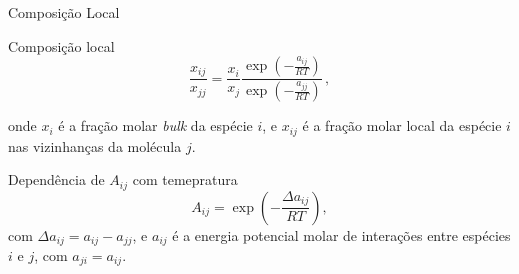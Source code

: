 \documentclass{beamer}
\begin{document}
\begin{frame}{Composição Local}
	\begin{block}{Composição local}
		\begin{equation}
		\frac{x_{ij}}{x_{jj}}=\frac{x_i}{x_j} \frac{\exp(-\frac{a_{ij}}{RT})}{\exp(-\frac{a_{jj}}{RT})}\,,
		\end{equation}
	\end{block}
onde  $x_i$ 
é a fração molar {\it bulk} da espécie $i$, e 
$x_{ij}$ é a fração molar local da espécie $i$
nas vizinhanças da molécula $j$.
\end{frame}


\begin{frame}{Dependência de $A_{ij}$ com temepratura}
%
\begin{equation}
\label{eq:A1}
 A_{ij}=\exp\left( - \frac{\Delta a_{ij}}{RT}\right),
\end{equation}
com $\Delta a_{ij}=a_{ij}-a_{jj}$, e
$a_{ij}$ 
é a energia potencial molar de interações entre espécies 
$i$ e $j$, com $a_{ji}=a_{ij}$. 
%
%
	\begin{columns}
		\begin{column}{5cm}


\end{column}
\end{columns}
\end{frame}
\end{document}
